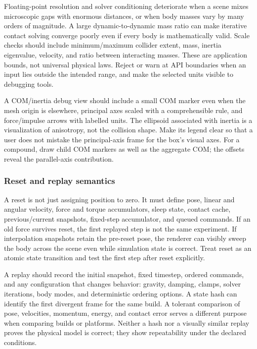 Floating-point resolution and solver conditioning deteriorate when a scene mixes microscopic gaps with enormous distances, or when body masses vary by many orders of magnitude. A large dynamic-to-dynamic mass ratio can make iterative contact solving converge poorly even if every body is mathematically valid. Scale checks should include minimum/maximum collider extent, mass, inertia eigenvalue, velocity, and ratio between interacting masses. These are application bounds, not universal physical laws. Reject or warn at API boundaries when an input lies outside the intended range, and make the selected units visible to debugging tools.

A COM/inertia debug view should include a small COM marker even when the mesh origin is elsewhere, principal axes scaled with a comprehensible rule, and force/impulse arrows with labelled units. The ellipsoid associated with inertia is a visualization of anisotropy, not the collision shape. Make its legend clear so that a user does not mistake the principal-axis frame for the box's visual axes. For a compound, draw child COM markers as well as the aggregate COM; the offsets reveal the parallel-axis contribution.

\subsubsection{Reset and replay semantics}\label{06-engine-ii-ch034-reset-and-replay-semantics}

\hypertarget{06-engine-ii-ch034-reset-and-replay-semantics}{}

A reset is not just assigning position to zero. It must define pose, linear and angular velocity, force and torque accumulators, sleep state, contact cache, previous/current snapshots, fixed-step accumulator, and queued commands. If an old force survives reset, the first replayed step is not the same experiment. If interpolation snapshots retain the pre-reset pose, the renderer can visibly sweep the body across the scene even while simulation state is correct. Treat reset as an atomic state transition and test the first step after reset explicitly.

A replay should record the initial snapshot, fixed timestep, ordered commands, and any configuration that changes behavior: gravity, damping, clamps, solver iterations, body modes, and deterministic ordering options. A state hash can identify the first divergent frame for the same build. A tolerant comparison of pose, velocities, momentum, energy, and contact error serves a different purpose when comparing builds or platforms. Neither a hash nor a visually similar replay proves the physical model is correct; they show repeatability under the declared conditions.

